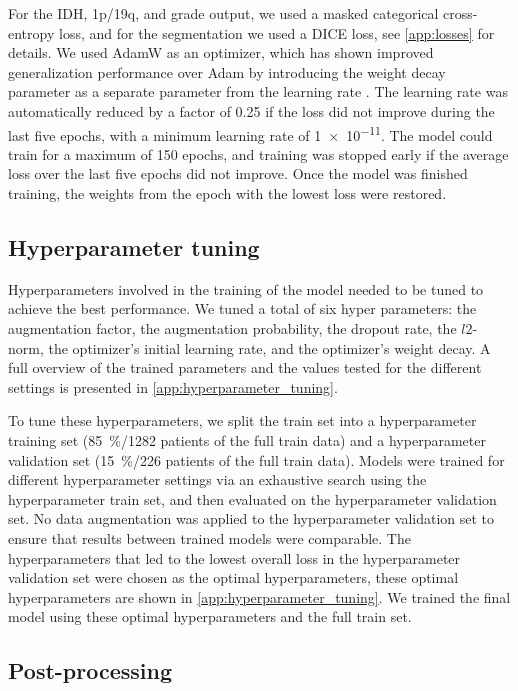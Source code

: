 For the \gls{IDH}, 1p/19q, and grade output, we used a masked categorical cross-entropy loss, and for the segmentation we used a DICE loss, see \cref{app:losses} for details.
We used AdamW as an optimizer, which has shown improved generalization performance over Adam by introducing the weight decay parameter as a separate parameter from the learning rate \autocite{loshchilov2017decoupled}.
The learning rate was automatically reduced by a factor of \num{0.25} if the loss did not improve during the last five epochs, with a minimum learning rate of \num{1e-11}.
The model could train for a maximum of \num{150} epochs, and training was stopped early if the average loss over the last five epochs did not improve.
Once the model was finished training, the weights from the epoch with the lowest loss were restored.

\subsection{Hyperparameter tuning}\label{sec:parameter_selection}

Hyperparameters involved in the training of the model needed to be tuned to achieve the best performance.
We tuned a total of six hyper parameters: the augmentation factor, the augmentation probability, the dropout rate, the $l2$-norm, the optimizer's initial learning rate, and the optimizer's weight decay.
A full overview of the trained parameters and the values tested for the different settings is presented in \cref{app:hyperparameter_tuning}.

To tune these hyperparameters, we split the train set into a hyperparameter training set (\SI{85}{\percent}/\num{1282} patients of the full train data) and a hyperparameter validation set (\SI{15}{\percent}/\num{226} patients of the full train data).
Models were trained for different hyperparameter settings via  an exhaustive search using the hyperparameter train set, and then evaluated on the hyperparameter validation set.
No data augmentation was applied to the hyperparameter validation set to ensure that results between trained models were comparable.
The hyperparameters that led to the lowest overall loss in the hyperparameter validation set were chosen as the optimal hyperparameters, these optimal hyperparameters are shown in \cref{app:hyperparameter_tuning}.
We trained the final model using these optimal hyperparameters and the full train set.

\subsection{Post-processing}

